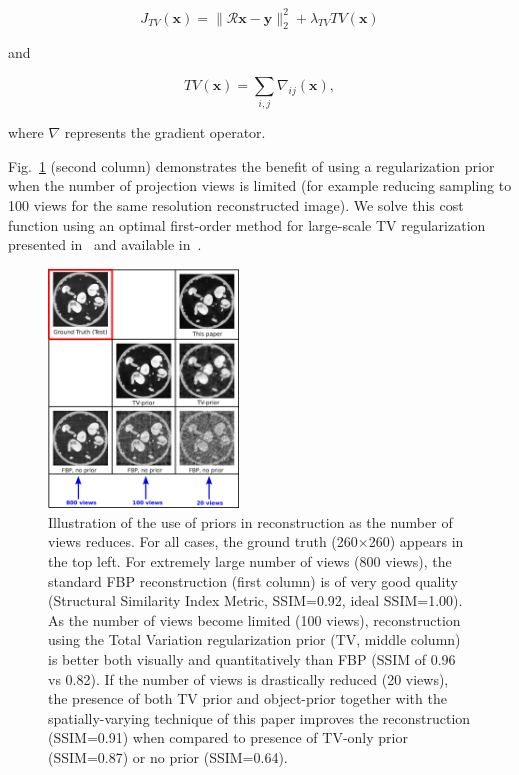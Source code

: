 \documentclass[journal]{IEEEtran}
\begin{document}
 \begin{equation}
   J_{TV}(\boldsymbol{x}) = \lVert\boldsymbol{\mathcal{R}x}- \boldsymbol{y}\rVert_2^2 + \lambda_{TV}TV(\boldsymbol{x})
   \label{Eq:simple_TV}
 \end{equation}

 and 

  \begin{equation}
   TV(\boldsymbol{x}) = \sum_{i,j}\nabla_{ij}(\boldsymbol{x}),
   \label{Eq:definition_TV}
\end{equation}

  where $\nabla$ represents the gradient operator.
  
 Fig.~\ref{fig:story} (second column) demonstrates the benefit of
 using a regularization prior when the number of projection views is
 limited (for example reducing sampling to 100 views for the same resolution reconstructed image).  We solve this cost function using an optimal
 first-order method for large-scale TV regularization presented
 in~\cite{TVReg} and available in~\cite{TVReg-lib}.


 \begin{figure}[t]
\centering
	\includegraphics[width=0.45\textwidth]{../images/story/post_TCI/story.png}
        \caption{Illustration of the use of priors in reconstruction
          as the number of views reduces. For all cases, the ground
          truth (260$\times$260) appears in the top left.  For
          extremely large number of views (800 views), the standard
          FBP reconstruction (first column) is of very good quality
          (Structural Similarity Index Metric, SSIM=0.92, ideal SSIM=1.00). As the
          number of views become limited (100 views), reconstruction
          using the Total Variation regularization prior (TV, middle
          column) is better both visually and quantitatively than FBP
          (SSIM of 0.96 vs 0.82). If the number of views is
          drastically reduced (20 views), the presence of both TV
          prior and object-prior together with the spatially-varying
          technique of this paper improves the reconstruction
          (SSIM=0.91) when compared to presence of TV-only prior
          (SSIM=0.87) or no prior (SSIM=0.64).
}
 \label{fig:story}
 \end{figure} 
\end{document}
